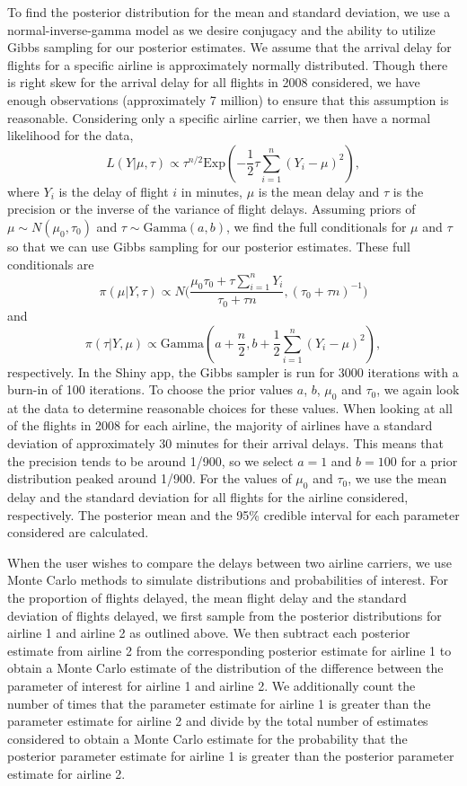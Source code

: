 \documentclass{article} %
\begin{document}
To find the posterior distribution for the mean and standard deviation, we use a normal-inverse-gamma model as we desire conjugacy and the ability to utilize Gibbs sampling for our posterior estimates. We assume that the arrival delay for flights for a specific airline is approximately normally distributed. Though there is right skew for the arrival delay for all flights in 2008 considered, we have enough observations (approximately 7 million) to ensure that this assumption is reasonable. Considering only a specific airline carrier, we then have a normal likelihood for the data, 
$$L(Y | \mu, \tau) \propto \tau^{n/2}\mbox{Exp}(-\dfrac{1}{2}\tau \sum_{i=1}^n (Y_i - \mu)^2),$$ where $Y_i$ is the delay of flight $i$ in minutes, $\mu$ is the mean delay and $\tau$ is the precision or the inverse of the variance of flight delays.  Assuming priors of $\mu\sim N(\mu_0, \tau_0)$ and $\tau\sim\mbox{Gamma}(a,b )$, we find the full conditionals for $\mu$ and $\tau$ so that we can use Gibbs sampling for our posterior estimates. These full conditionals are $$\pi(\mu | Y, \tau)\propto N \Big( \dfrac{\mu_0\tau_0+\tau\sum_{i=1}^n Y_i}{\tau_0+\tau n}, (\tau_0+\tau n)^{-1}\Big)$$ and $$\pi(\tau | Y, \mu)\propto\mbox{Gamma}(a+\dfrac{n}{2}, b+\dfrac{1}{2}\sum_{i=1}^n (Y_i - \mu)^2),$$ respectively. In the Shiny app, the Gibbs sampler is run for 3000 iterations with a burn-in of 100 iterations. To choose the prior values $a$, $b$, $\mu_0$ and $\tau_0$, we again look at the data to determine reasonable choices for these values. When looking at all of the flights in 2008 for each airline, the majority of airlines have a standard deviation of approximately 30 minutes for their arrival delays. This means that the precision tends to be around 1/900, so we select $a=1$ and $b = 100$ for a prior distribution peaked around 1/900. For the values of $\mu_0$ and $\tau_0$, we use the mean delay and the standard deviation for all flights for the airline considered, respectively. The posterior mean and the 95\% credible interval for each parameter considered are calculated.

When the user wishes to compare the delays between two airline carriers, we use Monte Carlo methods to simulate distributions and probabilities of interest. For the proportion of flights delayed, the mean flight delay and the standard deviation of flights delayed, we first sample from the posterior distributions for airline 1 and airline 2 as outlined above. We then subtract each posterior estimate from airline 2 from the corresponding posterior estimate for airline 1 to obtain a Monte Carlo estimate of the distribution of the difference between the parameter of interest for airline 1 and airline 2. We additionally count the number of times that the parameter estimate for airline 1 is greater than the parameter estimate for airline 2 and divide by the total number of estimates considered to obtain a Monte Carlo estimate for the probability that the posterior parameter estimate for airline 1 is greater than the posterior parameter estimate for airline 2. 
\end{document}
